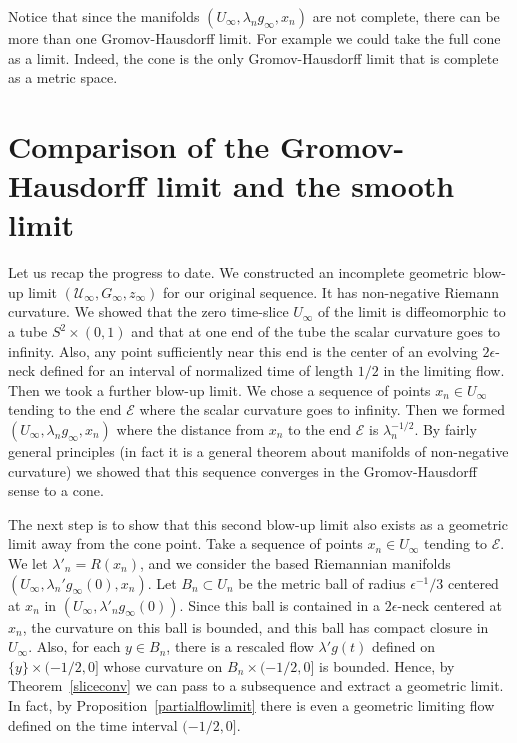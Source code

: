 \begin{remark}
\label{rem:noncomplete-multiple-limits}
Notice that since the manifolds $(U_\infty,\lambda_ng_\infty,x_n)$
are not complete, there can be more than one Gromov-Hausdorff limit.
For example we could take the full cone as a limit. Indeed, the cone
is the only Gromov-Hausdorff limit that is complete as a metric
space.
\end{remark}


\section{Comparison of the Gromov-Hausdorff limit and the smooth
limit}

Let us recap the progress to date. We constructed an incomplete
geometric blow-up limit $({\mathcal U}_\infty,G_\infty,z_\infty)$
for our original sequence. It has non-negative Riemann curvature. We
showed that the zero time-slice $U_\infty$ of the limit is
diffeomorphic to a tube $S^2\times (0,1)$ and that at one end of the
tube the scalar curvature goes to infinity. Also, any point
sufficiently near this end is the center of an evolving
$2\epsilon$-neck defined for an interval of normalized  time of
length $1/2$ in the limiting flow. Then we took a further blow-up
limit. We chose a sequence of points $x_n\in U_\infty$ tending to
the end ${\mathcal E}$ where the scalar curvature goes to infinity.
Then we formed $(U_\infty,\lambda_ng_\infty,x_n)$ where the distance
from $x_n$ to the end ${\mathcal E}$ is $\lambda_n^{-1/2}$. By
fairly general principles (in fact it is a general theorem about
manifolds of non-negative curvature) we showed that this sequence
converges in the Gromov-Hausdorff
sense to a cone.

The next step is to show that this second blow-up limit also exists
as a geometric limit away from the cone point. Take a sequence of
points $x_n\in U_\infty$ tending to ${\mathcal E}$. We let
$\lambda'_n=R(x_n)$, and we consider the based Riemannian manifolds
$(U_\infty,\lambda_n'g_\infty(0),x_n)$. Let $B_n\subset U_n$ be the
metric ball of radius $\epsilon^{-1}/3$ centered at $x_n$ in
$(U_\infty,\lambda'_ng_\infty(0))$. Since this ball is contained in
a $2\epsilon$-neck centered at $x_n$, the curvature on this ball is
bounded, and this ball has compact closure in $U_\infty$. Also, for
each $y\in B_n$, there is a rescaled flow $\lambda'g(t)$  defined on
$\{y\}\times (-1/2,0]$ whose  curvature on $B_n\times (-1/2,0]$ is
bounded. Hence, by Theorem~\ref{sliceconv} we can pass to a
subsequence and extract a geometric limit. In fact, by
Proposition~\ref{partialflowlimit} there is even a geometric
limiting flow defined on the time interval $(-1/2,0]$.

